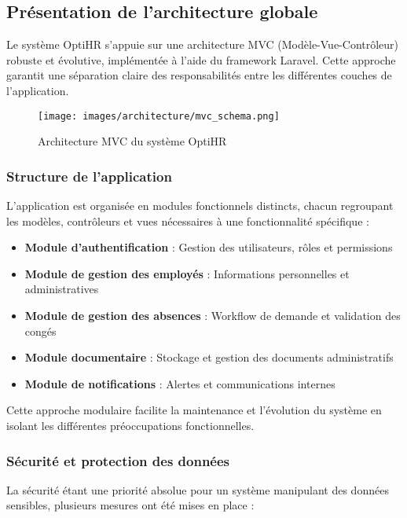 \subsection{Présentation de l'architecture globale}

Le système OptiHR s'appuie sur une architecture MVC (Modèle-Vue-Contrôleur) robuste et évolutive, implémentée à l'aide du framework Laravel. Cette approche garantit une séparation claire des responsabilités entre les différentes couches de l'application.

\begin{figure}[H]
    \centering
    \texttt{[image: images/architecture/mvc\_schema.png]}
    \caption{Architecture MVC du système OptiHR}
    \label{fig:mvc_schema}
\end{figure}

\subsubsection{Structure de l'application}

L'application est organisée en modules fonctionnels distincts, chacun regroupant les modèles, contrôleurs et vues nécessaires à une fonctionnalité spécifique :

\begin{itemize}
    \item \textbf{Module d'authentification} : Gestion des utilisateurs, rôles et permissions
    \item \textbf{Module de gestion des employés} : Informations personnelles et administratives
    \item \textbf{Module de gestion des absences} : Workflow de demande et validation des congés
    \item \textbf{Module documentaire} : Stockage et gestion des documents administratifs
    \item \textbf{Module de notifications} : Alertes et communications internes
\end{itemize}

Cette approche modulaire facilite la maintenance et l'évolution du système en isolant les différentes préoccupations fonctionnelles.

\subsubsection{Sécurité et protection des données}

La sécurité étant une priorité absolue pour un système manipulant des données sensibles, plusieurs mesures ont été mises en place :

